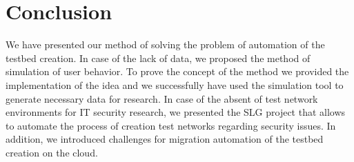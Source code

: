 
\section{Conclusion}

We have presented our method of solving the problem of automation of the testbed creation. In case of the lack of data, we proposed the method of simulation of user behavior. To prove the concept of the method we provided the implementation of the idea and we successfully have used the simulation tool to generate necessary data for research. In case of the absent of test network environments for IT security research, we presented the SLG project that allows to automate the process of creation test networks regarding security issues. In addition, we introduced challenges for migration automation of the testbed creation on the cloud.

